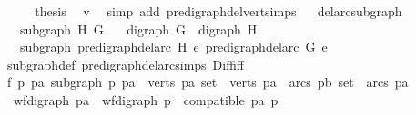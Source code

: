 \begin{isabellebody}
\ \ \isamarkupfalse%
\ \isamarkupfalse%
\ {\isacharquery}{\kern0pt}thesis\ \isamarkupfalse%
\ v\ \isamarkupfalse%
\ {\isacharparenleft}{\kern0pt}simp\ add{\isacharcolon}{\kern0pt}\ pre{\isacharunderscore}{\kern0pt}digraph{\isachardot}{\kern0pt}del{\isacharunderscore}{\kern0pt}vert{\isacharunderscore}{\kern0pt}simps{\isacharparenright}{\kern0pt}\isanewline
{}\isamarkupfalse%
%
\endisatagproof
{\isafoldproof}%
%
\isadelimproof
\ \isanewline
%
\endisadelimproof
\isanewline
{}\isamarkupfalse%
\ del{\isacharunderscore}{\kern0pt}arc{\isacharunderscore}{\kern0pt}subgraph{\isacharcolon}{\kern0pt}\isanewline
\ \ \ {\isachardoublequoteopen}subgraph\ H\ G{\isachardoublequoteclose}\isanewline
\ \ \ {\isachardoublequoteopen}digraph\ G\ {\isasymand}\ digraph\ H{\isachardoublequoteclose}\isanewline
\ \ \ {\isachardoublequoteopen}subgraph\ {\isacharparenleft}{\kern0pt}pre{\isacharunderscore}{\kern0pt}digraph{\isachardot}{\kern0pt}del{\isacharunderscore}{\kern0pt}arc\ H\ e{}{\isacharparenright}{\kern0pt}\ {\isacharparenleft}{\kern0pt}pre{\isacharunderscore}{\kern0pt}digraph{\isachardot}{\kern0pt}del{\isacharunderscore}{\kern0pt}arc\ G\ e{}{\isacharparenright}{\kern0pt}{\isachardoublequoteclose}\isanewline
%
\isadelimproof
\ \ %
\endisadelimproof
%
\isatagproof
{}\isamarkupfalse%
\ subgraph{\isacharunderscore}{\kern0pt}def\ pre{\isacharunderscore}{\kern0pt}digraph{\isachardot}{\kern0pt}del{\isacharunderscore}{\kern0pt}arc{\isacharunderscore}{\kern0pt}simps\ Diff{\isacharunderscore}{\kern0pt}iff\isanewline
{}\isamarkupfalse%
\ {\isacharminus}{\kern0pt}\isanewline
\ \ \isamarkupfalse%
\ f{}{\isacharcolon}{\kern0pt}\ {\isachardoublequoteopen}{\isasymforall}p\ pa{\isachardot}{\kern0pt}\ subgraph\ p\ pa\ {\isacharequal}{\kern0pt}\ {\isacharparenleft}{\kern0pt}{\isacharparenleft}{\kern0pt}verts\ p{\isacharcolon}{\kern0pt}{\isacharcolon}{\kern0pt}{\isacharprime}{\kern0pt}a\ set{\isacharparenright}{\kern0pt}\ {\isasymsubseteq}\ verts\ pa\ {\isasymand}\ {\isacharparenleft}{\kern0pt}arcs\ p{\isacharcolon}{\kern0pt}{\isacharcolon}{\kern0pt}{\isacharprime}{\kern0pt}b\ set{\isacharparenright}{\kern0pt}\ {\isasymsubseteq}\ arcs\ pa\ {\isasymand}\ \isanewline
\ \ wf{\isacharunderscore}{\kern0pt}digraph\ pa\ {\isasymand}\ wf{\isacharunderscore}{\kern0pt}digraph\ p\ {\isasymand}\ compatible\ pa\ p{\isacharparenright}{\kern0pt}{\isachardoublequoteclose}\isanewline

\end{isabellebody}

